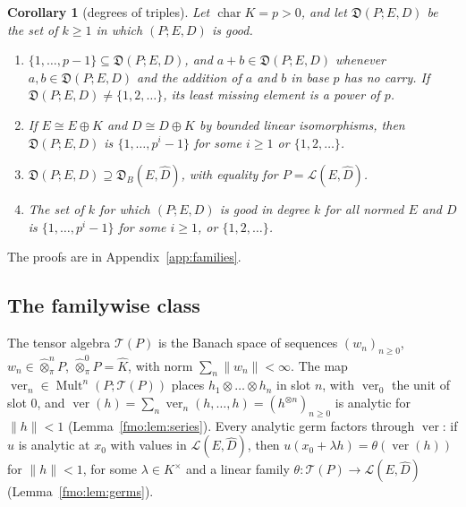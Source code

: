 \documentclass[11pt]{amsart}
\newtheorem{corollary}[theorem]{Corollary}
\theoremstyle{definition}
\theoremstyle{remark}
\numberwithin{equation}{section}
\newcommand{\cL}{\mathcal L}
\newcommand{\Mult}{\operatorname{Mult}}
\newcommand{\norm}[1]{\lVert #1\rVert}
\newcommand{\Kh}{\widehat K}
\theoremstyle{plain}
\theoremstyle{definition}
\theoremstyle{plain}
\newcommand{\fD}{\mathfrak D}
\begin{document}
\begin{corollary}[degrees of triples]\label{fam2:cor:degrees}
Let $\operatorname{char}K=p>0$, and let $\fD(P;E,D)$ be the set of $k\ge1$ in which $(P;E,D)$ is good.
\begin{enumerate}
\item $\{1,\dots,p-1\}\subseteq\fD(P;E,D)$, and $a+b\in\fD(P;E,D)$ whenever $a,b\in\fD(P;E,D)$ and the addition of $a$ and
$b$ in base $p$ has no carry. If $\fD(P;E,D)\ne\{1,2,\dots\}$, its least missing element is a power of $p$.
\item If $E\cong E\oplus K$ and $D\cong D\oplus K$ by bounded linear isomorphisms, then $\fD(P;E,D)$ is
$\{1,\dots,p^i-1\}$ for some $i\ge1$ or $\{1,2,\dots\}$.
\item $\fD(P;E,D)\supseteq\fD_B(E,\widehat D)$, with equality for $P=\cL(E,\widehat D)$.
\item The set of $k$ for which $(P;E,D)$ is good in degree $k$ for all normed $E$ and $D$ is $\{1,\dots,p^i-1\}$ for some
$i\ge1$, or $\{1,2,\dots\}$.
\end{enumerate}
\end{corollary}

The proofs are in Appendix~\ref{app:families}.

\subsection{The familywise class}\label{fam2:ssec:class}

The tensor algebra $\mathcal T(P)$ is the Banach space of sequences $(w_n)_{n\ge0}$, $w_n\in\widehat\otimes^n_\pi P$,
$\widehat\otimes^0_\pi P=\Kh$, with norm $\sum_n\norm{w_n}<\infty$. The map $\operatorname{ver}_n\in\Mult^n(P;\mathcal T(P))$
places $h_1\otimes\dots\otimes h_n$ in slot $n$, with $\operatorname{ver}_0$ the unit of slot $0$, and
$\operatorname{ver}(h)=\sum_n\operatorname{ver}_n(h,\dots,h)=(h^{\otimes n})_{n\ge0}$ is analytic for $\norm h<1$
(Lemma~\ref{fmo:lem:series}). Every analytic germ factors through $\operatorname{ver}$: if $u$ is analytic at $x_0$ with
values in $\cL(E,\widehat D)$, then $u(x_0+\lambda h)=\theta(\operatorname{ver}(h))$ for $\norm h<1$, for some
$\lambda\in K^\times$ and a linear family $\theta\colon\mathcal T(P)\to\cL(E,\widehat D)$ (Lemma~\ref{fmo:lem:germs}).
\end{document}
